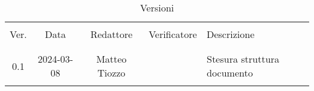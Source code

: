 \documentclass[italian,12pt]{article}
\begin{document}


\newpage



\begin{table}[!h]
	\caption{Versioni}
	\footnotesize
	\begin{center}
		\begin{tabular}{ c c c c p{6.1cm} }
			\hline                                                                         \\[-2ex]
			Ver. & Data       & Redattore     & Verificatore & Descrizione                 \\
			\\[-2ex] \hline \\[-1.5ex]
			0.1  & 2024-03-08 & Matteo Tiozzo &              & Stesura struttura documento \\
			\\[-1.5ex] \hline
		\end{tabular}
	\end{center}
\end{table}

\newpage

\tableofcontents

\newpage








\end{document}
